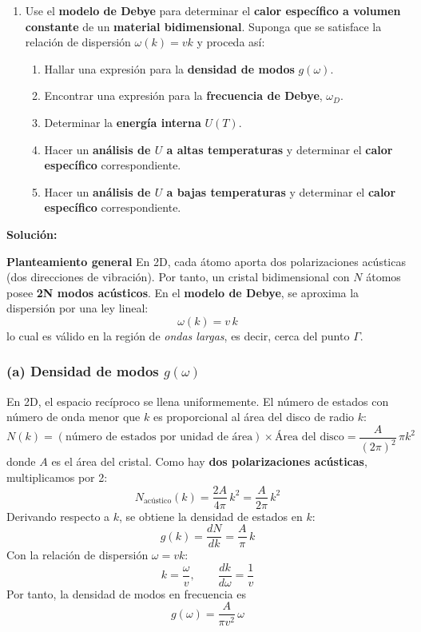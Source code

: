 \documentclass{article}
\newenvironment{AGbox}[1][7]%
{%
  \begin{tcolorbox}[
    enhanced, breakable,
    colframe=AppleGreen,
    colback=AppleGreen!#1,
    boxrule=1pt,
    borderline west={2mm}{-10mm}{AppleGreen},
    sharp corners=southwest,
    left=14pt,right=14pt,top=10pt,bottom=10pt,
     boxsep=6pt,
  ]%
}{%
  \end{tcolorbox}%
}
\begin{document}
\begin{AGbox}[8]
\begin{enumerate}[label={{\textcolor{trueblue}{\textbf{Pr.} \arabic*.5}}}, start=1]
  \item Use el \textbf{modelo de Debye} para determinar el \textbf{calor específico a volumen constante} de un \textbf{material bidimensional}. Suponga que se satisface la relación de dispersión $\omega(k)=v k$ y proceda así:
  \begin{enumerate}[label=\textbf{(\alph*)}]
    \item Hallar una expresión para la \textbf{densidad de modos} $g(\omega)$.
    \item Encontrar una expresión para la \textbf{frecuencia de Debye}, $\omega_D$.
    \item Determinar la \textbf{energía interna} $U(T)$.
    \item Hacer un \textbf{análisis de $U$ a altas temperaturas} y determinar el \textbf{calor específico} correspondiente.
    \item Hacer un \textbf{análisis de $U$ a bajas temperaturas} y determinar el \textbf{calor específico} correspondiente.
  \end{enumerate}
\end{enumerate}
\end{AGbox}

\textcolor{Cinnabar}{\textbf{Solución:}}

\noindent\textbf{Planteamiento general}\;
En 2D, cada átomo aporta dos polarizaciones acústicas (dos direcciones de vibración). Por tanto, un cristal bidimensional con $N$ átomos posee \textbf{2N modos acústicos}. En el \textbf{modelo de Debye}, se aproxima la dispersión por una ley lineal:
\[
\omega(k)=v\,k
\]
lo cual es válido en la región de \textit{ondas largas}, es decir, cerca del punto $\Gamma$.

\subsubsection*{\textbf{(a) Densidad de modos $g(\omega)$}}
En 2D, el espacio recíproco se llena uniformemente. El número de estados con número de onda menor que $k$ es proporcional al área del disco de radio $k$:
\[
N(k) = (\text{número de estados por unidad de área}) \times \text{Área del disco}
= \frac{A}{(2\pi)^2}\,\pi k^2
\]
donde $A$ es el área del cristal. Como hay \textbf{dos polarizaciones acústicas}, multiplicamos por 2:
\[
N_{\text{acústico}}(k) = \frac{2A}{4\pi}\,k^2 = \frac{A}{2\pi}\,k^2
\]
Derivando respecto a $k$, se obtiene la densidad de estados en $k$:
\[
g(k)=\frac{dN}{dk}=\frac{A}{\pi}\,k
\]
Con la relación de dispersión $\omega = vk$:
\[
k=\frac{\omega}{v}, \qquad \frac{dk}{d\omega}=\frac{1}{v}
\]
Por tanto, la densidad de modos en frecuencia es
\begin{equation}
\boxed{\,g(\omega)=\frac{A}{\pi v^2}\,\omega\,}
\label{eq:debye2D_gw}
\end{equation}
\end{document}
